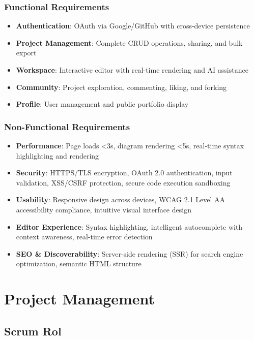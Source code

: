 \subsubsection{Functional Requirements}
\begin{itemize}
    \item \textbf{Authentication}: OAuth via Google/GitHub with cross-device persistence
    \item \textbf{Project Management}: Complete CRUD operations, sharing, and bulk export
    \item \textbf{Workspace}: Interactive editor with real-time rendering and AI assistance
    \item \textbf{Community}: Project exploration, commenting, liking, and forking
    \item \textbf{Profile}: User management and public portfolio display
\end{itemize}

\subsubsection{Non-Functional Requirements}
\begin{itemize}
    \item \textbf{Performance}: Page loads <3s, diagram rendering <5s, real-time syntax highlighting and rendering
    \item \textbf{Security}: HTTPS/TLS encryption, OAuth 2.0 authentication, input validation, XSS/CSRF protection, secure code execution sandboxing
    \item \textbf{Usability}: Responsive design across devices, WCAG 2.1 Level AA accessibility compliance, intuitive visual interface design
    \item \textbf{Editor Experience}: Syntax highlighting, intelligent autocomplete with context awareness, real-time error detection
    \item \textbf{SEO \& Discoverability}: Server-side rendering (SSR) for search engine optimization, semantic HTML structure
\end{itemize}

\section{Project Management}

\subsection{Scrum Rol}

